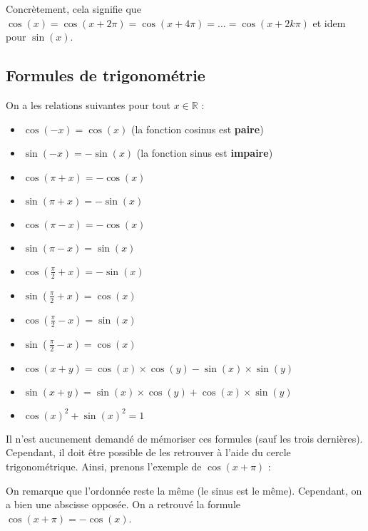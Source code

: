 	\begin{tip}
		Concrètement, cela signifie que $\cos(x) = \cos(x + 2\pi) = \cos(x + 4\pi) = \dots = \cos(x + 2k\pi)$ et idem pour $\sin(x)$.
	\end{tip}

	\subsection{Formules de trigonométrie}

	\begin{formula}[Formules]
		On a les relations suivantes pour tout $x \in \mathbb{R}$ :
		\begin{itemize}
			\item $\cos(-x) = \cos(x)$ (la fonction cosinus est \textbf{paire})
			\item $\sin(-x) = -\sin(x)$ (la fonction sinus est \textbf{impaire})
			\item $\cos(\pi + x) = -\cos(x)$
			\item $\sin(\pi + x) = -\sin(x)$
			\item $\cos(\pi - x) = -\cos(x)$
			\item $\sin(\pi - x) = \sin(x)$
			\item $\cos \left(\frac{\pi}{2} + x \right) = -\sin(x)$
			\item $\sin \left(\frac{\pi}{2} + x \right) = \cos(x)$
			\item $\cos \left(\frac{\pi}{2} - x \right) = \sin(x)$
			\item $\sin \left(\frac{\pi}{2} - x \right) = \cos(x)$
			\item $\cos(x + y) = \cos(x) \times \cos(y) - \sin(x) \times \sin(y)$
			\item $\sin(x + y) = \sin(x) \times \cos(y) + \cos(x) \times \sin(y)$
			\item $\cos(x)^2 + \sin(x)^2 = 1$
		\end{itemize}
	\end{formula}

	\begin{tip}
		Il n'est aucunement demandé de mémoriser ces formules (sauf les trois dernières). Cependant, il doit être possible de les retrouver à l'aide du cercle trigonométrique. Ainsi, prenons l'exemple de $\cos(x + \pi)$ :


		On remarque que l'ordonnée reste la même (le sinus est le même). Cependant, on a bien une abscisse opposée. On a retrouvé la formule $\cos(x + \pi) = -\cos(x)$.
	\end{tip}

